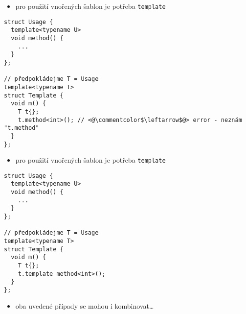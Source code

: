 \begin{frame}[fragile]
\begin{block}{}
\begin{itemize}
\item pro použití vnořených šablon je potřeba \lstinline|template|
\end{itemize}
\end{block}

\begin{noblock}
\begin{lstlisting}[basicstyle=\small]
struct Usage {
  template<typename U>
  void method() {
    ...
  }
};

// předpokládejme T = Usage
template<typename T>
struct Template {
  void m() {
    T t{};
    t.method<int>(); // <@\commentcolor$\leftarrow$@> error - neznám "t.method"
  }
};
\end{lstlisting}
\end{noblock}
\end{frame}






\begin{frame}[fragile]
\begin{block}{}
\begin{itemize}
\item pro použití vnořených šablon je potřeba \lstinline|template|
\end{itemize}
\end{block}

\begin{yesblock}
\begin{lstlisting}[basicstyle=\small]
struct Usage {
  template<typename U>
  void method() {
    ...
  }
};

// předpokládejme T = Usage
template<typename T>
struct Template {
  void m() {
    T t{};
    t.template method<int>();
  }
};
\end{lstlisting}
\end{yesblock}
\end{frame}









\begin{frame}[fragile]
\begin{block}{}
\begin{itemize}
\item oba uvedené případy se mohou i kombinovat\ldots
\end{itemize}
\end{block}
\end{frame}


